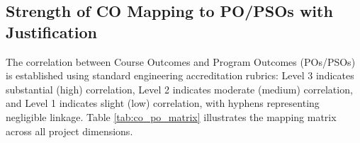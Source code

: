 \documentclass[a4paper, 12pt]{report}
\begin{document}
\begin{table}[H]
    \centering
    \caption{Course Outcomes (CO) Statements}\label{tab:co_statements}
    \renewcommand{\arraystretch}{1.25}
\end{table}

\subsection{Strength of CO Mapping to PO/PSOs with Justification}
The correlation between Course Outcomes and Program Outcomes (POs/PSOs) is established using standard engineering accreditation rubrics: Level 3 indicates substantial (high) correlation, Level 2 indicates moderate (medium) correlation, and Level 1 indicates slight (low) correlation, with hyphens representing negligible linkage. Table \ref{tab:co_po_matrix} illustrates the mapping matrix across all project dimensions.
\end{document}
